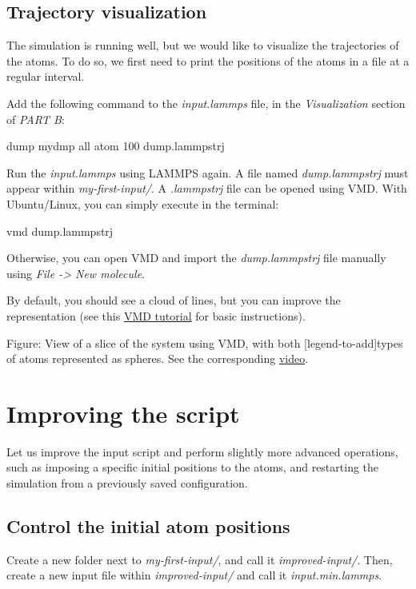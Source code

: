 \subsection{Trajectory visualization}
\noindent The simulation is running well, but we would like to
visualize the trajectories of the atoms. To do so, we first need
to print the positions of the atoms in a file at a regular interval.

\vspace{0.25cm} \noindent Add the following command to the \textit{input.lammps} file,
in the \textit{Visualization} section of \textit{PART B}:

\begin{lcverbatim}
dump mydmp all atom 100 dump.lammpstrj
\end{lcverbatim}

\noindent Run the \textit{input.lammps} using LAMMPS again. A file named \textit{dump.lammpstrj}
must appear within \textit{my-first-input/}. A \textit{.lammpstrj} file can
be opened using VMD. With Ubuntu/Linux, you can simply execute in the terminal:

\begin{lcverbatim}
vmd dump.lammpstrj
\end{lcverbatim}

\noindent Otherwise, you can open VMD and import the \textit{dump.lammpstrj}
file manually using \textit{File -> New molecule}.

\vspace{0.25cm} \noindent By default, you should see a cloud
of lines, but you can improve the representation (see this \hyperref[vmd-label]{VMD tutorial}
for basic instructions).

\vspace{0.25cm} Figure: View of a slice of the system using VMD, with both
[legend-to-add]types of atoms represented as spheres. See the corresponding \href{https://youtu.be/vdSIJM5fVJE}{video}.

\section{Improving the script}
\noindent Let us improve the input script and perform slightly more
advanced operations, such as imposing a specific initial
positions to the atoms, and restarting the simulation
from a previously saved configuration. 

\subsection{Control the initial atom positions}
\noindent Create a new folder next to \textit{my-first-input/}, and call
it \textit{improved-input/}. Then, create a new input file within \textit{improved-input/}
and call it \textit{input.min.lammps}.

